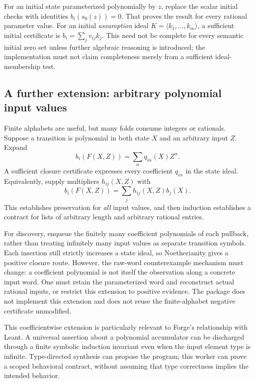 For an initial state parameterized polynomially by $z$, replace the scalar initial checks with identities $b_i(s_0(z))=0$. That proves the result for every rational parameter value. For an initial \emph{assumption} ideal $K=\langle k_1,\ldots,k_m\rangle$, a sufficient initial certificate is $b_i=\sum_jv_{ij}k_j$. This need not be complete for every semantic initial zero set unless further algebraic reasoning is introduced; the implementation must not claim completeness merely from a sufficient ideal-membership test.

\subsection{A further extension: arbitrary polynomial input values}
\label{sec:inputcoeff}

Finite alphabets are useful, but many folds consume integers or rationals. Suppose a transition is polynomial in both state $X$ and an arbitrary input $Z$. Expand
\[
 b_i(F(X,Z))=\sum_\alpha q_{i\alpha}(X)Z^\alpha.
\]
A sufficient closure certificate expresses every coefficient $q_{i\alpha}$ in the state ideal. Equivalently, supply multipliers $h_{ij}(X,Z)$ with
\[
 b_i(F(X,Z))=\sum_jh_{ij}(X,Z)b_j(X).
\]
This establishes preservation for \emph{all} input values, and then induction establishes a contract for lists of arbitrary length and arbitrary rational entries.

For discovery, enqueue the finitely many coefficient polynomials of each pullback, rather than treating infinitely many input values as separate transition symbols. Each insertion still strictly increases a state ideal, so Noetherianity gives a positive closure route. However, the raw-word counterexample mechanism must change: a coefficient polynomial is not itself the observation along a concrete input word. One must retain the parameterized word and reconstruct actual rational inputs, or restrict this extension to positive evidence. The package does not implement this extension and does not reuse the finite-alphabet negative certificate unmodified.

This coefficientwise extension is particularly relevant to Forge's relationship with Leant. A universal assertion about a polynomial accumulator can be discharged through a finite symbolic induction invariant even when the input element type is infinite. Type-directed synthesis can propose the program; this worker can prove a scoped behavioral contract, without assuming that type correctness implies the intended behavior.
